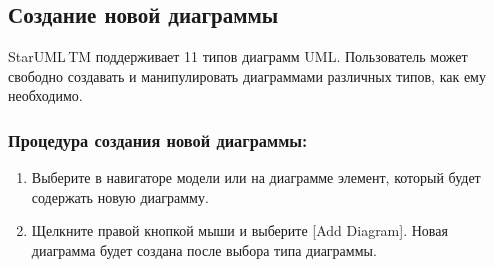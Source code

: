\documentclass[a4paper,12pt]{extreport}
\newcommand{\staruml}{StarUML\,\tm}
\begin{document}
\subsection*{Создание новой диаграммы}
\staruml TM поддерживает 11 типов диаграмм UML. Пользователь может свободно создавать и
манипулировать диаграммами различных типов, как ему необходимо.
\subsubsection*{Процедура создания новой диаграммы:}
\begin{enumerate}
	\item Выберите в навигаторе модели или на диаграмме элемент, который будет содержать новую
	диаграмму.
	\item Щелкните правой кнопкой мыши и выберите [Add Diagram]. Новая диаграмма будет
	создана после выбора типа диаграммы.
\end{enumerate}
\end{document}
